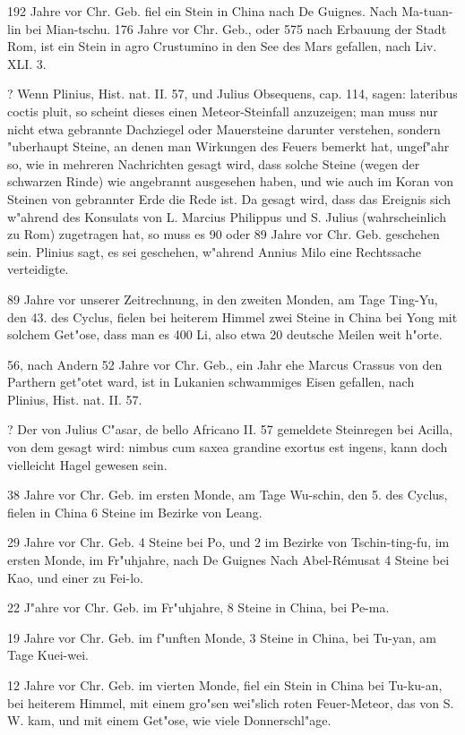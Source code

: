 \documentclass[a4paper, 11pt, oneside, polutonikogreek, german]{article}
\begin{document}
192 Jahre vor Chr. Geb. fiel ein Stein in China nach De Guignes. Nach Ma-tuan-lin bei Mian-tschu. 176 Jahre vor Chr. Geb., oder 575 nach Erbauung der Stadt Rom, ist ein Stein in agro Crustumino in den See des Mars gefallen, nach Liv. XLI. 3.

? Wenn Plinius, Hist. nat. II. 57, und Julius Obsequens, cap. 114, sagen: lateribus coctis pluit, so scheint dieses einen Meteor-Steinfall anzuzeigen; man muss nur nicht etwa gebrannte Dachziegel oder Mauersteine darunter verstehen, sondern "uberhaupt Steine, an denen man Wirkungen des Feuers bemerkt hat, ungef"ahr so, wie in mehreren Nachrichten gesagt wird, dass solche Steine (wegen der schwarzen Rinde) wie angebrannt ausgesehen haben, und wie auch im Koran von Steinen von gebrannter Erde die Rede ist. Da gesagt wird, dass das Ereignis sich w"ahrend des Konsulats von L. Marcius Philippus und S. Julius (wahrscheinlich zu Rom) zugetragen hat, so muss es 90 oder 89 Jahre vor Chr. Geb. geschehen sein. Plinius sagt, es sei geschehen, w"ahrend Annius Milo eine Rechtssache verteidigte.

89 Jahre vor unserer Zeitrechnung, in den zweiten Monden, am Tage Ting-Yu, den 43. des Cyclus, fielen bei heiterem Himmel zwei Steine in China bei Yong mit solchem Get"ose, dass man es 400 Li, also etwa 20 deutsche Meilen weit h"orte.

56, nach Andern 52 Jahre vor Chr. Geb., ein Jahr ehe Marcus Crassus von den Parthern get"otet ward, ist in Lukanien schwammiges Eisen gefallen, nach Plinius, Hist. nat. II. 57.

? Der von Julius C"asar, de bello Africano II. 57 gemeldete Steinregen bei Acilla, von dem gesagt wird: nimbus cum saxea grandine exortus est ingens, kann doch vielleicht Hagel gewesen sein.

38 Jahre vor Chr. Geb. im ersten Monde, am Tage Wu-schin, den 5. des Cyclus, fielen in China 6 Steine im Bezirke von Leang.

29 Jahre vor Chr. Geb. 4 Steine bei Po, und 2 im Bezirke von Tschin-ting-fu, im ersten Monde, im Fr"uhjahre, nach De Guignes Nach Abel-Rémusat 4 Steine bei Kao, und einer zu Fei-lo.

22 J"ahre vor Chr. Geb. im Fr"uhjahre, 8 Steine in China, bei Pe-ma.

19 Jahre vor Chr. Geb. im f"unften Monde, 3 Steine in China, bei Tu-yan, am Tage Kuei-wei.

12 Jahre vor Chr. Geb. im vierten Monde, fiel ein Stein in China bei Tu-ku-an, bei heiterem Himmel, mit einem gro"sen wei"slich roten Feuer-Meteor, das von S. W. kam, und mit einem Get"ose, wie viele Donnerschl"age.
\end{document}
